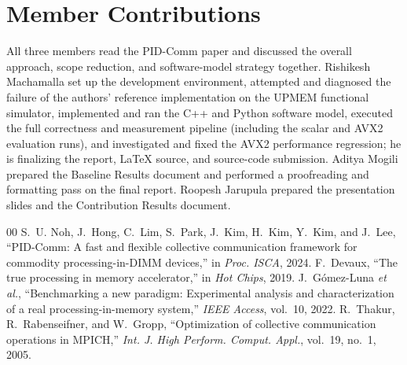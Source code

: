 \documentclass[conference]{IEEEtran}
\begin{document}
\section*{Member Contributions}
All three members read the PID-Comm paper and discussed the overall approach, scope reduction, and software-model strategy together. Rishikesh Machamalla set up the development environment, attempted and diagnosed the failure of the authors' reference implementation on the UPMEM functional simulator, implemented and ran the C++ and Python software model, executed the full correctness and measurement pipeline (including the scalar and AVX2 evaluation runs), and investigated and fixed the AVX2 performance regression; he is finalizing the report, LaTeX source, and source-code submission. Aditya Mogili prepared the Baseline Results document and performed a proofreading and formatting pass on the final report. Roopesh Jarupula prepared the presentation slides and the Contribution Results document.

\begin{thebibliography}{00}
 S.~U. Noh, J.~Hong, C.~Lim, S.~Park, J.~Kim, H.~Kim, Y.~Kim, and J.~Lee, ``PID-Comm: A fast and flexible collective communication framework for commodity processing-in-DIMM devices,'' in \emph{Proc. ISCA}, 2024.
 F.~Devaux, ``The true processing in memory accelerator,'' in \emph{Hot Chips}, 2019.
 J.~G{\'o}mez-Luna \emph{et al.}, ``Benchmarking a new paradigm: Experimental analysis and characterization of a real processing-in-memory system,'' \emph{IEEE Access}, vol.~10, 2022.
 R.~Thakur, R.~Rabenseifner, and W.~Gropp, ``Optimization of collective communication operations in MPICH,'' \emph{Int. J. High Perform. Comput. Appl.}, vol.~19, no.~1, 2005.
\end{thebibliography}
\end{document}
